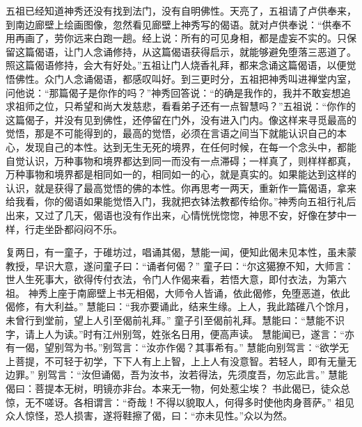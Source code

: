 \documentclass[12pt,twoside,openany]{book}
\newcommand{\kai}[1]{{\CJKfamily{kai}#1}}
\begin{document}
\kai{五祖已经知道神秀还没有找到法门，没有自明佛性。天亮了，五祖请了卢供奉来，到南边廊壁上绘画图像，忽然看见廊壁上神秀写的偈语。就对卢供奉说：“供奉不用再画了，劳你远来白跑一趟。经上说：所有的可见身相，都是虚妄不实的。只保留这篇偈语，让门人念诵修持，从这篇偈语获得启示，就能够避免堕落三恶道了。照这篇偈语修持，会大有好处。”五祖让门人烧香礼拜，都来念诵这篇偈语，以便觉悟佛性。众门人念诵偈语，都感叹叫好。到三更时分，五祖把神秀叫进禅堂内室，问他说：“那篇偈子是你作的吗？”神秀回答说：“的确是我作的，我并不敢妄想追求祖师之位，只希望和尚大发慈悲，看看弟子还有一点智慧吗？”五祖说：“你作的这篇偈子，并没有见到佛性，还停留在门外，没有进入门内。像这样来寻觅最高的觉悟，那是不可能得到的，最高的觉悟，必须在言语之间当下就能认识自己的本心，发现自己的本性。达到无生无死的境界，在任何时候，在每一个念头中，都能自觉认识，万种事物和境界都达到同一而没有一点滞碍；一样真了，则样样都真，万种事物和境界都是相同如一的，相同如一的心，就是真实的。如果能达到这样的认识，就是获得了最高觉悟的佛的本性。你再思考一两天，重新作一篇偈语，拿来给我看，你的偈语如果能觉悟入门，我就把衣钵法教都传给你。”神秀向五祖行礼后出来，又过了几天，偈语也没有作出来，心情恍恍惚惚，神思不安，好像在梦中一样，行走坐卧都闷闷不乐。}

复两日，有一童子，于碓坊过，唱诵其偈，慧能一闻，便知此偈未见本性，虽未蒙教授，早识大意，遂问童子曰：“诵者何偈？”
童子曰：“尔这獦獠不知，大师言：世人生死事大，欲得传付衣法，令门人作偈来看，若悟大意，即付衣法，为第六祖。
神秀上座于南廊壁上书无相偈，大师令人皆诵，依此偈修，免堕恶道，依此偈修，有大利益。”
慧能曰：“我亦要诵此，结来生缘。上人，我此踏碓八个馀月，未曾行到堂前，望上人引至偈前礼拜。”
童子引至偈前礼拜。慧能曰：“慧能不识字，请上人为读。”时有江州别驾，姓张名日用，便高声读。
慧能闻已，遂言：“亦有一偈，望别驾为书。”别驾言：“汝亦作偈？其事希有。”
慧能向别驾言：“欲学无上菩提，不可轻于初学，下下人有上上智，上上人有没意智。若轻人，即有无量无边罪。”
别驾言：“汝但诵偈，吾为汝书，汝若得法，先须度吾，勿忘此言。”
慧能偈曰：菩提本无树，明镜亦非台。本来无一物，何处惹尘埃？
书此偈已，徒众总惊，无不嗟讶。各相谓言：“奇哉！不得以貌取人，何得多时使他肉身菩萨。”
祖见众人惊怪，恐人损害，遂将鞋擦了偈，曰：“亦未见性。”众以为然。
\end{document}
